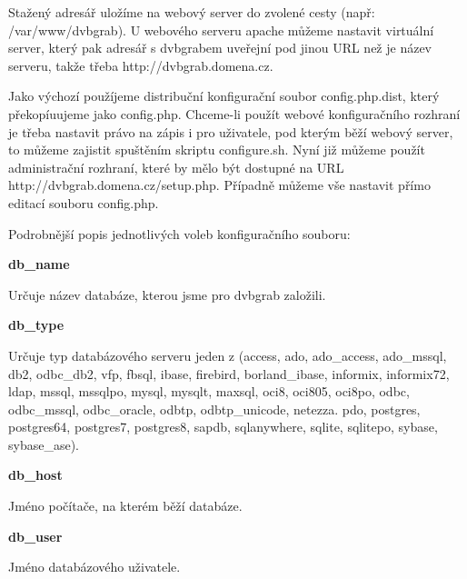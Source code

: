 \vspace{10pt}

Stažený adresář uložíme na webový server do zvolené cesty (např: /var/www/dvbgrab). U webového serveru apache můžeme nastavit virtuální server, který pak adresář s dvbgrabem uveřejní pod jinou URL než je název serveru, takže třeba http://dvbgrab.domena.cz.

\vspace{10pt}

Jako výchozí použíjeme distribuční konfigurační soubor config.php.dist, který překopíuujeme jako config.php.
Chceme-li použít webové konfiguračního rozhraní je třeba nastavit právo na zápis i pro uživatele, pod kterým běží webový server, to můžeme zajistit spuštěním skriptu configure.sh. Nyní již můžeme použít administrační rozhraní, které by mělo být dostupné na URL http://dvbgrab.domena.cz/setup.php. Případně můžeme vše nastavit přímo editací souboru config.php.

\vspace{10pt}

Podrobnější popis jednotlivých voleb konfiguračního souboru:

\vspace{10pt}

\textbf{db\_name}

Určuje název databáze, kterou jsme pro dvbgrab založili.

\vspace{10pt}

\textbf{db\_type}

Určuje typ databázového serveru jeden z (access, ado, ado\_access, ado\_mssql, db2, odbc\_db2, vfp, fbsql, ibase, firebird, borland\_ibase, informix, informix72, ldap, mssql, mssqlpo, mysql, mysqlt, maxsql, oci8, oci805, oci8po, odbc, odbc\_mssql, odbc\_oracle, odbtp, odbtp\_unicode, netezza. pdo, postgres, postgres64, postgres7, postgres8, sapdb, sqlanywhere, sqlite, sqlitepo, sybase, sybase\_ase).

\vspace{10pt}

\textbf{db\_host}

Jméno počítače, na kterém běží databáze.

\vspace{10pt}

\textbf{db\_user}

Jméno databázového uživatele.

\vspace{10pt}

